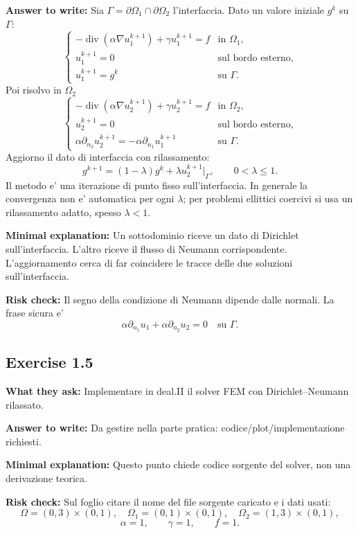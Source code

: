 \documentclass[11pt,a4paper]{article}
\begin{document}
\textbf{Answer to write:}
Sia \(\Gamma=\partial\Omega_1\cap\partial\Omega_2\) l'interfaccia. Dato un valore iniziale \(g^k\) su \(\Gamma\):
\[
\begin{cases}
-\operatorname{div}(\alpha\nabla u_1^{k+1})+\gamma u_1^{k+1}=f & \text{in }\Omega_1,\\
u_1^{k+1}=0 & \text{sul bordo esterno},\\
u_1^{k+1}=g^k & \text{su }\Gamma.
\end{cases}
\]
Poi risolvo in \(\Omega_2\)
\[
\begin{cases}
-\operatorname{div}(\alpha\nabla u_2^{k+1})+\gamma u_2^{k+1}=f & \text{in }\Omega_2,\\
u_2^{k+1}=0 & \text{sul bordo esterno},\\
\alpha\partial_{n_2}u_2^{k+1}
=-\alpha\partial_{n_1}u_1^{k+1} & \text{su }\Gamma.
\end{cases}
\]
Aggiorno il dato di interfaccia con rilassamento:
\[
g^{k+1}=(1-\lambda)g^k+\lambda u_2^{k+1}|_\Gamma,
\qquad 0<\lambda\le1.
\]
Il metodo e' una iterazione di punto fisso sull'interfaccia. In generale la convergenza non e' automatica per ogni \(\lambda\); per problemi ellittici coercivi si usa un rilassamento adatto, spesso \(\lambda<1\).

\textbf{Minimal explanation:}
Un sottodominio riceve un dato di Dirichlet sull'interfaccia. L'altro riceve il flusso di Neumann corrispondente. L'aggiornamento cerca di far coincidere le tracce delle due soluzioni sull'interfaccia.

\textbf{Risk check:}
Il segno della condizione di Neumann dipende dalle normali. La frase sicura e'
\[
\alpha\partial_{n_1}u_1+\alpha\partial_{n_2}u_2=0\quad\text{su }\Gamma.
\]

\subsection*{Exercise 1.5}
\textbf{What they ask:} Implementare in deal.II il solver FEM con Dirichlet--Neumann rilassato.

\textbf{Answer to write:}
Da gestire nella parte pratica: codice/plot/implementazione richiesti.

\textbf{Minimal explanation:}
Questo punto chiede codice sorgente del solver, non una derivazione teorica.

\textbf{Risk check:}
Sul foglio citare il nome del file sorgente caricato e i dati usati:
\[
\Omega=(0,3)\times(0,1),\quad
\Omega_1=(0,1)\times(0,1),\quad
\Omega_2=(1,3)\times(0,1),
\]
\[
\alpha=1,\qquad \gamma=1,\qquad f=1.
\]
\end{document}
